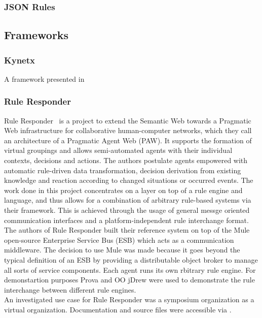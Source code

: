 \documentclass[11pt,twocolumn]{article}
\begin{document}
\subsubsection{JSON Rules}


\subsection{Frameworks}

\subsubsection{Kynetx}
A framework presented in ~\cite{bookTheLiveWeb}

\subsubsection{Rule Responder}
Rule Responder~\cite{2007-Paschke_etal-RuleResponder.pdf} is a project to extend the Semantic Web towards a Pragmatic Web infrastructure for collaborative human-computer networks, which they call an architecture of a Pragmatic Agent Web (PAW). It supports the formation of virtual groupings and allows semi-automated agents with their individual contexts, decisions and actions. The authors postulate agents empowered with automatic rule-driven data transformation, decision derivation from existing knowledge and reaction according to changed situations or occurred events. The work done in this project concentrates on a layer on top of a rule engine and language, and thus allows for a combination of arbitrary rule-based systems via their framework. This is achieved through the usage of general messge oriented communication interfaces and a platform-independent rule interchange format.
\\
The authors of Rule Responder built their reference system on top of the Mule~\cite{wwwmuleesb} open-source Enterprise Service Bus (ESB) which acts as a communication middleware. The decision to use Mule was made because it goes beyond the typical definition of an ESB by providing a distributable object broker to manage all sorts of service components. Each agent runs its own rbitrary rule engine. For demonstartion purposes Prova and OO jDrew were used to demonstrate the rule interchange between different rule engines.
\\
An investigated use case for Rule Responder was a symposium organization as a virtual organization.
Documentation and source files were accessible via \cite{wwwruleresponder}. 
\end{document}
